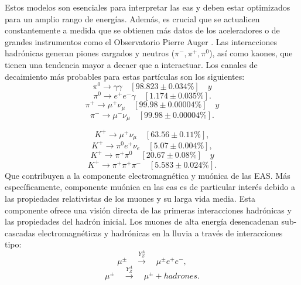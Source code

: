 Estos modelos son esenciales para interpretar las \gls{eas} y deben estar optimizados para un amplio rango de energías. Además, es crucial que se actualicen constantemente a medida que se obtienen más datos de los aceleradores o de grandes instrumentos como el Observatorio Pierre Auger \cite{andrada_2021}. Las interacciones hadrónicas generan piones cargados y neutros ($\pi^{-},\pi^{+},\pi^{0}$), así como kaones, que tienen una tendencia mayor a decaer que a interactuar. Los canales de decaimiento más probables para estas partículas son los siguientes:
\begin{equation*}
\pi^{0} \rightarrow \gamma\gamma \quad [{98.823 \pm 0.034}{\%}] \quad y
\end{equation*}
\begin{equation}
\pi^{0} \rightarrow e^{+}e^{-} \gamma \quad [{1.174 \pm 0.035}{\%}] .
\end{equation}
\begin{equation*}
\pi^{+} \rightarrow \mu^{+}\nu_{\mu} \quad [{99.98 \pm 0.00004}{\%}] \quad y
\end{equation*}
\begin{equation}
\pi^{-} \rightarrow \mu^{-}\nu_{\mu} \quad [{99.98 \pm 0.00004}{\%}] .
\end{equation}

\begin{equation*}
K^{+} \rightarrow \mu^{+}\nu_{\mu} \quad [{63.56 \pm 0.11}{\%}],
\end{equation*}
%
\begin{equation}
K^{+} \rightarrow \pi^{0}e^{+}\nu_{e} \quad [{5.07 \pm 0.004}{\%}],
\end{equation}
%
\begin{equation*}
K^{+} \rightarrow \pi^{+}\pi^{0} \quad [{20.67 \pm 0.08}{\%}] \quad y
\end{equation*}
\begin{equation*}
K^{+} \rightarrow \pi^{+}\pi^{+}\pi^{-} \quad [{5.583 \pm 0.024}{\%}] .
\end{equation*}
Que contribuyen a la componente electromagnética y muónica de las EAS. Más específicamente, componente muónica en las \gls{eas} es de particular interés debido a las propiedades relativistas de los muones y su larga vida media. Esta componente ofrece una visión directa de las primeras interacciones hadrónicas y las propiedades del hadrón inicial. Los muones de alta energía desencadenan sub-cascadas electromagnéticas y hadrónicas en la lluvia a través de interacciones tipo:
\begin{equation}
\mu^{\pm} \quad \xrightarrow{Y^{A}_{Z}} \quad \mu^{\pm}e^{+}e^{-},
\end{equation}
\begin{equation}
\mu^{\pm} \quad \xrightarrow{Y^{A}_{Z}} \quad \mu^{\pm} + hadrones.
\end{equation}